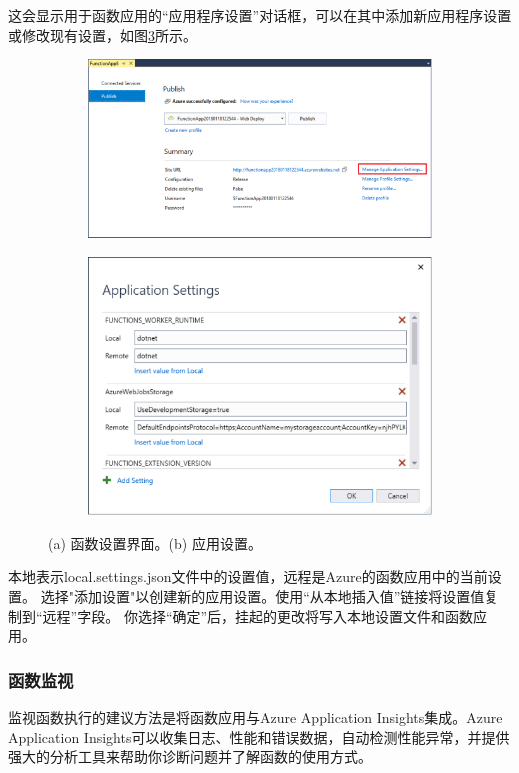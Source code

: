 这会显示用于函数应用的“应用程序设置”对话框，可以在其中添加新应用程序设置或修改现有设置，如图\ref{fig12}所示。
\begin{figure}[!htbp]
	\begin{subfigure}[b]{0.5\linewidth}
		\includegraphics[width=\linewidth]{figs/11.png}
		\caption{}
		\label{fig11}
	\end{subfigure}
	\begin{subfigure}[b]{0.5\linewidth}
		\includegraphics[width=\linewidth]{figs/12.png}
		\caption{}
		\label{fig12}
	\end{subfigure}
	\caption{(a) 函数设置界面。(b) 应用设置。}
\end{figure}

本地表示local.settings.json文件中的设置值，远程是Azure的函数应用中的当前设置。 选择"添加设置"以创建新的应用设置。使用“从本地插入值”链接将设置值复制到“远程”字段。 你选择“确定”后，挂起的更改将写入本地设置文件和函数应用。

\subsubsection{函数监视} 
监视函数执行的建议方法是将函数应用与Azure Application Insights集成。Azure Application Insights可以收集日志、性能和错误数据，自动检测性能异常，并提供强大的分析工具来帮助你诊断问题并了解函数的使用方式。

